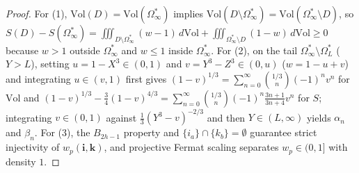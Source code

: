 \documentclass[11pt,a4paper]{article}
\theoremstyle{remark}
\begin{document}
\begin{proof}
For (1), $\mathrm{Vol}(D) = \mathrm{Vol}(\Omega_\infty^*)$ implies $\mathrm{Vol}(D \setminus \Omega_\infty^*) = \mathrm{Vol}(\Omega_\infty^* \setminus D)$, so $S(D) - S(\Omega_\infty^*) = \iiint_{D \setminus \Omega_\infty^*} (w - 1)\,d\mathrm{Vol} + \iiint_{\Omega_\infty^* \setminus D} (1 - w)\,d\mathrm{Vol} \ge 0$ because $w > 1$ outside $\Omega_\infty^*$ and $w \le 1$ inside $\Omega_\infty^*$. For (2), on the tail $\Omega_\infty^* \setminus \Omega_L^*$ ($Y > L$), setting $u = 1 - X^3 \in (0, 1)$ and $v = Y^3 - Z^3 \in (0, u)$ ($w = 1 - u + v$) and integrating $u \in (v, 1)$ first gives $(1 - v)^{1/3} = \sum_{n=0}^\infty \binom{1/3}{n}(-1)^n v^n$ for $\mathrm{Vol}$ and $(1 - v)^{1/3} - \frac{3}{4}(1 - v)^{4/3} = \sum_{n=0}^\infty \binom{1/3}{n}(-1)^n \frac{3n+1}{3n+4} v^n$ for $S$; integrating $v \in (0, 1)$ against $\frac{1}{3}(Y^3 - v)^{-2/3}$ and then $Y \in (L, \infty)$ yields $\alpha_n$ and $\beta_n$. For (3), the $B_{2h-1}$ property and $\{i_a\} \cap \{k_b\} = \emptyset$ guarantee strict injectivity of $w_p(\mathbf{i}, \mathbf{k})$, and projective Fermat scaling separates $w_p \in (0, 1]$ with density $1$.
\end{proof}
\end{document}
